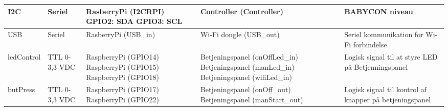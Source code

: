 \begin{center}
\begin{longtable}{|p{}|p{}|p{}|p{}|p{3cm}|}
I2C			
&Seriel		
&RasberryPi \newline (I2CRPI) \newline	
	GPIO2: SDA \newline	
	GPIO3: SCL \newline	
&Controller \newline (Controller) 			
&BABYCON niveau
\\\hline

USB		
&Seriel				
&RasberryPi \newline (USB\_in) 			
&Wi-Fi dongle \newline (USB\_out) \newline	
&Seriel kommunikation for Wi-Fi forbindelse
\\\hline

ledControl
&TTL 0-3,3 VDC		
&RaspberryPi \newline (GPIO14) \newline
 RaspberryPi \newline (GPIO15) \newline
 RaspberryPi \newline (GPIO18)
&Betjeningspanel \newline (onOffLed\_in) \newline
 Betjeningspanel \newline (manLed\_in) \newline
 Betjeningspanel \newline (wifiLed\_in)
&Logisk signal til at styre LED på Betjenningspanel
\\\hline

butPress
&TTL 0-3,3 VDC		
&RaspberryPi \newline (GPIO17) \newline
 RaspberryPi \newline (GPIO22)
&Betjeningspanel \newline (onOff\_out) \newline
 Betjeningspanel \newline (manStart\_out)
&Logisk signal til kontrol af knapper på betjeningspanel
\\\hline

\end{longtable}
\end{center}

